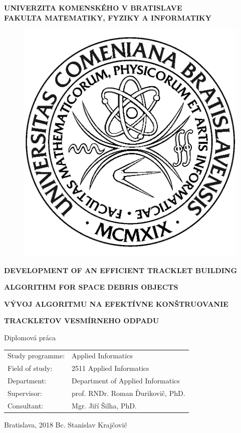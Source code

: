 \documentclass[12pt, a4paper, oneside]{book}
\newcommand{\mfthesistype}{Diplomová práca}
\newcommand{\mfauthor}{Bc. Stanislav Krajčovič}
\newcommand{\mfadvisor}{prof. RNDr. Roman Ďurikovič, PhD.}
\newcommand{\mfplacedate}{Bratislava, 2018}
\newcommand{\mfuniversity}{UNIVERZITA KOMENSKÉHO V BRATISLAVE}
\newcommand{\mffaculty}{FAKULTA MATEMATIKY, FYZIKY A INFORMATIKY}
\begin{document}
\thispagestyle{empty}

\noindent
\begin{minipage}{\textwidth}
\begin{center}
\textbf{\mfuniversity \\
\mffaculty}
\end{center}
\end{minipage}

\vfill
\begin{figure}[!hbt]
\begin{center}
\includegraphics{images/logo_fmph}
\label{img:logo}
\end{center}
\end{figure}
\begin{center}
\begin{minipage}{0.8\textwidth}
		\centerline{\textbf{\Large\MakeUppercase{Development of an efficient tracklet building }}}
		\smallskip
		\centerline{\textbf{\Large\MakeUppercase{algorithm for space debris objects}}}
		\bigskip
		\centerline{\textbf{\Large\MakeUppercase{Vývoj algoritmu na efektívne konštruovanie }}}
		\smallskip
		\centerline{\textbf{\Large\MakeUppercase{trackletov vesmírneho odpadu}}}
		\bigskip
		\bigskip
		\centerline{\mfthesistype}
\end{minipage}
\end{center}
\vfill
\begin{tabular}{l l}
Study programme: & Applied Informatics\\
Field of study: & 2511 Applied Informatics\\
Department: & Department of Applied Informatics\\
Supervisor: & \mfadvisor \\
Consultant: & Mgr. Jiří Šilha, PhD.
\end{tabular}
\vfill
\noindent
\mfplacedate \hfill
\mfauthor
\eject 
\end{document}

